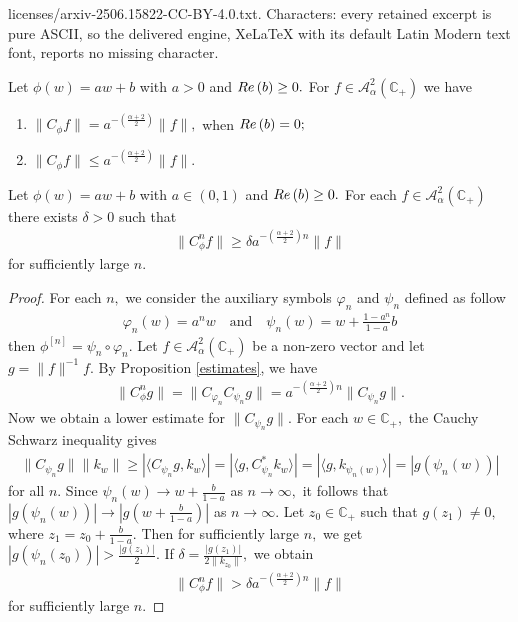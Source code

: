 \documentclass[10pt,a4paper]{amsart}
\newcommand{\Ber}{\mathcal{A}^2_{\alpha}(\hb)}
\newcommand{\hb}{\mathbb{C}_+}
\newcommand{\re}{{\rm Re}\,}
\begin{document}
licenses/arxiv-2506.15822-CC-BY-4.0.txt. Characters: every retained excerpt is pure ASCII, so the delivered engine, XeLaTeX with its default Latin Modern text font, reports no missing character.
\begin{prop}\label{estimates} Let $\phi(w)=a w+b$ with $a>0$ and $\re(b)\geq0.$ For $f\in \Ber$ we have 
\begin{enumerate}[label=\textnormal{(\roman*)}]
\item $\|C_{\phi}f\|=a^{-\left(\frac{\alpha+2}{2}\right)}\|f\|,$ when $\re(b)=0;$
\item $\|C_{\phi}f\|\leq a ^{-\left(\frac{\alpha+2}{2}\right)}\|f\|.$
\end{enumerate}
\end{prop}

\begin{lem}\label{lower estimates}
Let $\phi(w)=aw+b$ with $a\in (0,1)$ and $\re(b)\geq 0.$ For each $f\in \Ber$ there exists $\delta>0$ such that 
\begin{align*}
\|C_{\phi}^nf\|\geq \delta a ^{-\left(\frac{\alpha+2}{2}\right)n}\|f\|
\end{align*}
for sufficiently large $n.$  
\end{lem}

\begin{proof}
For each $n,$ we consider the auxiliary symbols $\varphi_n$ and $\psi_n$ defined as follow
\begin{align*}
\varphi_n(w)=a ^nw  \quad \text{and} \quad \psi_n(w)=w+\frac{1-a ^n}{1-a }b
\end{align*}
then $\phi^{[n]}=\psi_n\circ \varphi_n.$ Let $f\in \Ber$ be a non-zero vector and let $g=\|f\|^{-1}f.$ By Proposition \ref{estimates}, we have
\begin{align*}
\|C_{\phi}^ng\|=\|C_{\varphi_n}C_{\psi_n}g\|= a^{-\left(\frac{\alpha+2}{2}\right)n}\|C_{\psi_n}g\|.
\end{align*}
Now we obtain a lower estimate for $\|C_{\psi_n}g\|.$ For each $w\in \hb,$ the Cauchy Schwarz inequality gives
\begin{align*}
\|C_{\psi_n}g\|\|k_w\|\geq |\langle C_{\psi_n}g, k_w\rangle|=|\langle g, C_{\psi_n}^*k_w\rangle|=|\langle g, k_{\psi_n(w)}\rangle|=|g(\psi_n(w))|
\end{align*}
for all $n.$ Since $\psi_n(w)\rightarrow w+\frac{b}{1-a}$ as $n\rightarrow \infty,$ it follows that $|g(\psi_n(w))|\rightarrow |g(w+\frac{b}{1-a})|$ as $n\rightarrow \infty.$ Let $z_0\in \hb$ such that $g(z_1)\neq 0,$ where $z_1=z_0+\frac{b}{1-a}.$ Then for sufficiently large $n,$ we get
$|g(\psi_n(z_0))|>\frac{|g(z_1)|}{2}.$ If $\delta=\frac{|g(z_1)|}{2\|k_{z_0}\|},$ we obtain
\begin{align*}
\|C_{\phi}^nf\|> \delta a ^{-\left(\frac{\alpha+2}{2}\right)n}\|f\|
\end{align*}
for sufficiently large $n.$
\end{proof}
\end{document}
